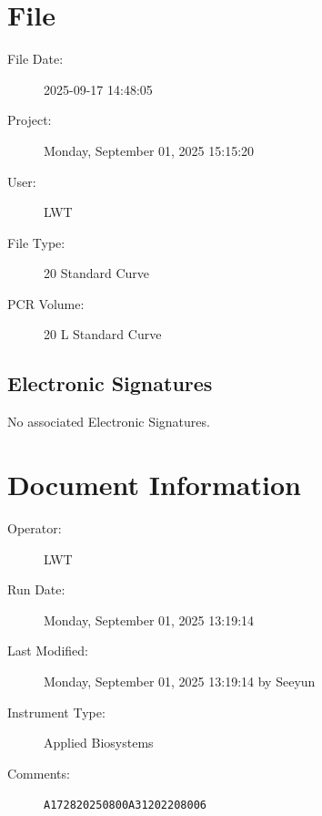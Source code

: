 \documentclass[UTF8,10pt,a4paper,fontset=fandol]{ctexart}
\newcommand{\fieldvalue}[1]{#1}
\begin{document}
\newpage

\section{File}

\begin{description}
\item[File Date:]%
\fieldvalue{2025-09-17 14:48:05}

\item[Project:]%
\fieldvalue{Monday, September 01, 2025 15:15:20}

\item[User:]%
\fieldvalue{LWT}

\item[File Type:]%
\fieldvalue{20 Standard Curve}

\item[PCR Volume:]%
\fieldvalue{20 \textmu L Standard Curve}
\end{description}

\subsection{Electronic Signatures}

No associated Electronic Signatures.

\section{Document Information}

\begin{description}
\item[Operator:]%
\fieldvalue{LWT}

\item[Run Date:]%
\fieldvalue{Monday, September 01, 2025 13:19:14}

\item[Last Modified:]%
\fieldvalue{Monday, September 01, 2025 13:19:14 by Seeyun}

\item[Instrument Type:]%
\fieldvalue{Applied Biosystems}

\item[Comments:]%
\fieldvalue{\texttt{A172820250800A31202208006}}
\end{description}
\end{document}
